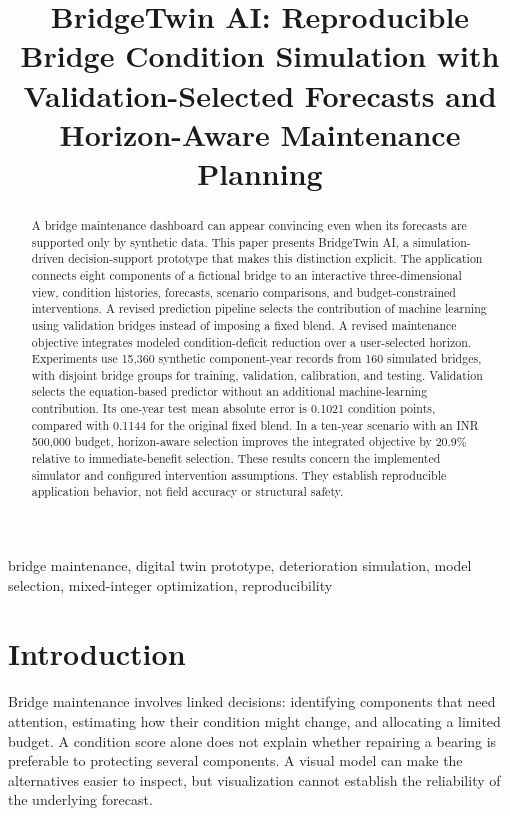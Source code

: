 \documentclass[conference]{IEEEtran}
\title{BridgeTwin AI: Reproducible Bridge Condition Simulation with Validation-Selected Forecasts and Horizon-Aware Maintenance Planning}
\author{\IEEEauthorblockN{Anonymous Authors}\IEEEauthorblockA{Manuscript prepared for author and supervisor review}}
\begin{document}
\maketitle
\begin{abstract}
A bridge maintenance dashboard can appear convincing even when its forecasts are supported only by synthetic data. This paper presents BridgeTwin AI, a simulation-driven decision-support prototype that makes this distinction explicit. The application connects eight components of a fictional bridge to an interactive three-dimensional view, condition histories, forecasts, scenario comparisons, and budget-constrained interventions. A revised prediction pipeline selects the contribution of machine learning using validation bridges instead of imposing a fixed blend. A revised maintenance objective integrates modeled condition-deficit reduction over a user-selected horizon. Experiments use 15,360 synthetic component-year records from 160 simulated bridges, with disjoint bridge groups for training, validation, calibration, and testing. Validation selects the equation-based predictor without an additional machine-learning contribution. Its one-year test mean absolute error is 0.1021 condition points, compared with 0.1144 for the original fixed blend. In a ten-year scenario with an INR 500,000 budget, horizon-aware selection improves the integrated objective by 20.9\% relative to immediate-benefit selection. These results concern the implemented simulator and configured intervention assumptions. They establish reproducible application behavior, not field accuracy or structural safety.
\end{abstract}
\begin{IEEEkeywords}
bridge maintenance, digital twin prototype, deterioration simulation, model selection, mixed-integer optimization, reproducibility
\end{IEEEkeywords}

\section{Introduction}
Bridge maintenance involves linked decisions: identifying components that need attention, estimating how their condition might change, and allocating a limited budget. A condition score alone does not explain whether repairing a bearing is preferable to protecting several components. A visual model can make the alternatives easier to inspect, but visualization cannot establish the reliability of the underlying forecast.
\end{document}
